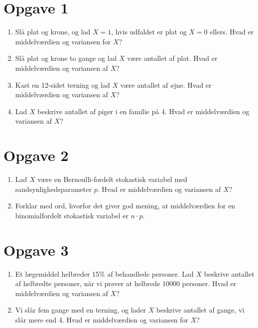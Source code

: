 \section*{Opgave 1}
\begin{enumerate}[label=\roman*)]
\item Slå plat og krone, og lad $X=1$, hvis udfaldet er plat og $X=0$ ellers. Hvad er middelværdien og variansen for $X$?
\item Slå plat og krone to gange og lad $X$ være antallet af plat. Hvad er middelværdien og variansen af $X$?
\item Kast en 12-sidet terning og lad $X$ være antallet af øjne. Hvad er middelværdien og variansen af $X$?
\item Lad $X$ beskrive antallet af piger i en familie på $4$. Hvad er middelværdien og variansen af $X$?
\end{enumerate}

\section*{Opgave 2}
\begin{enumerate}[label=\roman*)]
\item Lad $X$ være en Bernoulli-fordelt stokastisk variabel med sandsynlighedsparameter $p$. Hvad er middelværdien og variansen af $X$?
\item Forklar med ord, hvorfor det giver god mening, at middelværdien for en binomialfordelt stokastisk variabel er $n\cdot p$. 
\end{enumerate}

\section*{Opgave 3}
\begin{enumerate}[label=\roman*)]
\item Et lægemiddel helbreder 15$\%$ af behandlede personer. Lad $X$ beskrive antallet af helbredte personer, når vi prøver at helbrede $10000$ personer. Hvad er middelværdien og variansen af $X$?
\item Vi slår fem gange med en terning, og lader $X$ beskrive antallet af gange, vi slår mere end 4. Hvad er middelværdien og variansen for $X$?
\end{enumerate}
